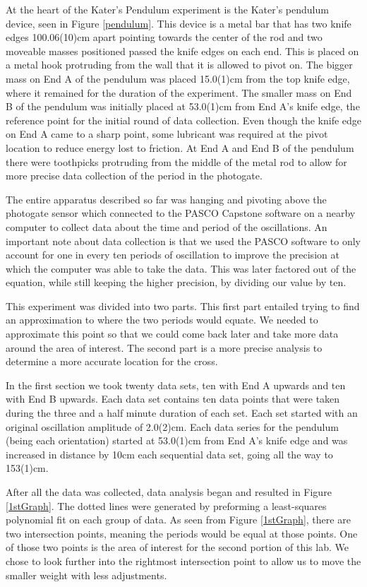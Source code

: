 \documentclass[aps,prl,10pt,twocolumn,floatfix]{revtex4-2}
\begin{document}
At the heart of the Kater's Pendulum experiment is the Kater's pendulum device, seen in Figure \ref{pendulum}. 
This device is a metal bar that has two knife edges 100.06(10)cm apart pointing towards the center of the rod and two moveable masses positioned passed the knife edges on each end. 
This is placed on a metal hook protruding from the wall that it is allowed to pivot on. 
The bigger mass on End A of the pendulum was placed 15.0(1)cm from the top knife edge, where it remained for the duration of the experiment. 
The smaller mass on End B of the pendulum was initially placed at 53.0(1)cm from End A's knife edge, the reference point for the initial round of data collection. 
Even though the knife edge on End A came to a sharp point, some lubricant was required at the pivot location to reduce energy lost to friction. 
At End A and End B of the pendulum there were toothpicks protruding from the middle of the metal rod to allow for more precise data collection of the period in the photogate. 

The entire apparatus described so far was hanging and pivoting above the photogate sensor which connected to the PASCO Capstone software on a nearby computer to collect data about the time and period of the oscillations. 
An important note about data collection is that we used the PASCO software to only account for one in every ten periods of oscillation to improve the precision at which the computer was able to take the data.
This was later factored out of the equation, while still keeping the higher precision, by dividing our value by ten. 

This experiment was divided into two parts. 
This first part entailed trying to find an approximation to where the two periods would equate.
We needed to approximate this point so that we could come back later and take more data around the area of interest.
The second part is a more precise analysis to determine a more accurate location for the cross.

In the first section we took twenty data sets, ten with End A upwards and ten with End B upwards. 
Each data set contains ten data points that were taken during the three and a half minute duration of each set.
Each set started with an original oscillation amplitude of 2.0(2)cm.
Each data series for the pendulum (being each orientation) started at 53.0(1)cm from End A's knife edge and was increased in distance by 10cm each sequential data set, going all the way to 153(1)cm. 

After all the data was collected, data analysis began and resulted in Figure \ref{1stGraph}.
The dotted lines were generated by preforming a least-squares polynomial fit on each group of data.
As seen from Figure \ref{1stGraph}, there are two intersection points, meaning the periods would be equal at those points.
One of those two points is the area of interest for the second portion of this lab.
We chose to look further into the rightmost intersection point to allow us to move the smaller weight with less adjustments.
\end{document}
